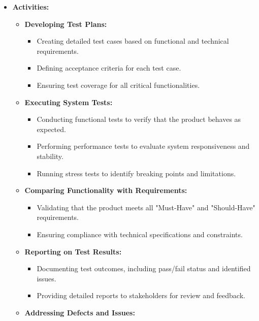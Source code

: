 \documentclass{article}
\begin{document}
\begin{itemize}[leftmargin=*, label={}]
    \item \textbf{Activities:}
        \begin{itemize}
            \item \textbf{Developing Test Plans:}
                \begin{itemize}
                    \item Creating detailed test cases based on functional and technical requirements.
                    \item Defining acceptance criteria for each test case.
                    \item Ensuring test coverage for all critical functionalities.
                \end{itemize}
            \item \textbf{Executing System Tests:}
                \begin{itemize}
                    \item Conducting functional tests to verify that the product behaves as expected.
                    \item Performing performance tests to evaluate system responsiveness and stability.
                    \item Running stress tests to identify breaking points and limitations.
                \end{itemize}
            \item \textbf{Comparing Functionality with Requirements:}
                \begin{itemize}
                    \item Validating that the product meets all "Must-Have" and "Should-Have" requirements.
                    \item Ensuring compliance with technical specifications and constraints.
                \end{itemize}
            \item \textbf{Reporting on Test Results:}
                \begin{itemize}
                    \item Documenting test outcomes, including pass/fail status and identified issues.
                    \item Providing detailed reports to stakeholders for review and feedback.
                \end{itemize}
            \item \textbf{Addressing Defects and Issues:}

\end{itemize}
\end{itemize}
\end{document}
